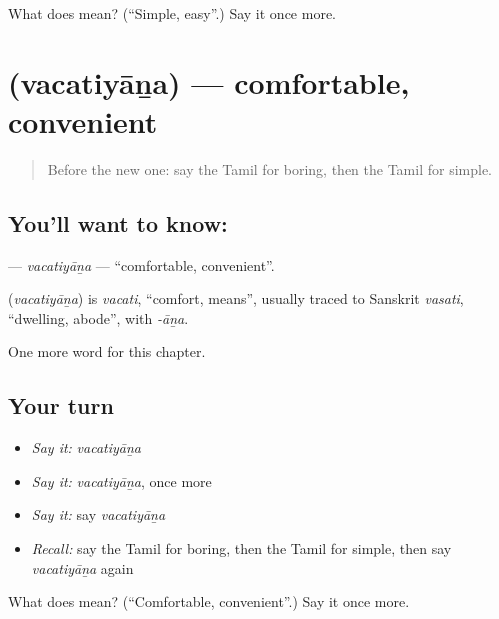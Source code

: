 \begin{tcolorbox}[breakable,colback=teal!4,colframe=teal!35!black,title={Before you move on}]
What does  mean? (\textquotedblleft{}Simple, easy\textquotedblright{}.) Say it once more.
\end{tcolorbox}
\section[\texorpdfstring{\ta{வசதியான} (vacatiyāṉa)}{வசதியான (vacatiyāṉa)}]{ (vacatiyāṉa) — comfortable, convenient}

\label{lesson:TA-C269-vacatiyana}



\begin{quote}
Before the new one: say the Tamil for boring, then the Tamil for simple.
\end{quote}

\subsection*{You'll want to know: }
\textbf{} — \emph{vacatiyāṉa} — \textquotedblleft{}comfortable, convenient\textquotedblright{}.

\begin{cousinweb}
\textbf{} (\emph{vacatiyāṉa}) is \emph{vacati}, \textquotedblleft{}comfort, means\textquotedblright{}, usually traced to Sanskrit \emph{vasati}, \textquotedblleft{}dwelling, abode\textquotedblright{}, with \emph{-āṉa}.
\end{cousinweb}

\begin{grammarlens}[title={What you've built}]
One more word for this chapter.
\end{grammarlens}

\subsection*{Your turn}
\begin{itemize}
\raggedright
  \item \emph{Say it:} \emph{vacatiyāṉa}
  \item \emph{Say it:} \emph{vacatiyāṉa}, once more
  \item \emph{Say it:} say \emph{vacatiyāṉa}
  \item \emph{Recall:} say the Tamil for boring, then the Tamil for simple, then say \emph{vacatiyāṉa} again
\end{itemize}

\begin{tcolorbox}[breakable,colback=teal!4,colframe=teal!35!black,title={Before you move on}]
What does  mean? (\textquotedblleft{}Comfortable, convenient\textquotedblright{}.) Say it once more.
\end{tcolorbox}
